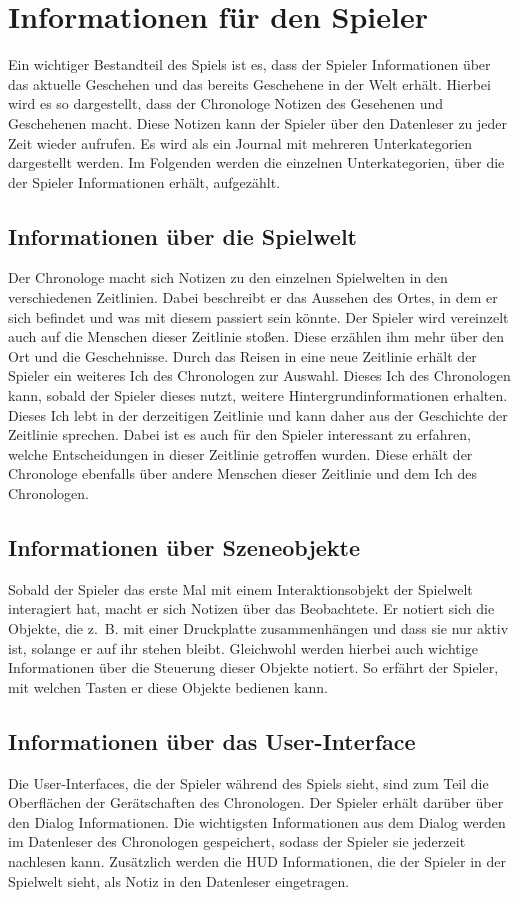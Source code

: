 \section{Informationen für den Spieler}
Ein wichtiger Bestandteil des Spiels ist es, dass der Spieler Informationen über das aktuelle Geschehen und das bereits Geschehene in der Welt erhält. Hierbei wird es so dargestellt, dass der Chronologe Notizen des Gesehenen und Geschehenen macht. Diese Notizen kann der Spieler über den Datenleser zu jeder Zeit wieder aufrufen. Es wird als ein Journal mit mehreren Unterkategorien dargestellt werden. 
Im Folgenden werden die einzelnen Unterkategorien, über die der Spieler Informationen erhält, aufgezählt.

\subsection{Informationen über die Spielwelt}
Der Chronologe macht sich Notizen zu den einzelnen Spielwelten in den verschiedenen Zeitlinien. Dabei beschreibt er das Aussehen des Ortes, in dem er sich befindet und was mit diesem passiert sein könnte. Der Spieler wird vereinzelt auch auf die Menschen dieser Zeitlinie stoßen. Diese erzählen ihm mehr über den Ort und die Geschehnisse. Durch das Reisen in eine neue Zeitlinie erhält der Spieler ein weiteres Ich des Chronologen zur Auswahl. Dieses Ich des Chronologen kann, sobald der Spieler dieses nutzt, weitere Hintergrundinformationen erhalten. Dieses Ich lebt in der derzeitigen Zeitlinie und kann daher aus der Geschichte der Zeitlinie sprechen. 
Dabei ist es auch für den Spieler interessant zu erfahren, welche Entscheidungen in dieser Zeitlinie getroffen wurden. Diese erhält der Chronologe ebenfalls über andere Menschen dieser Zeitlinie und dem Ich des Chronologen.

\subsection{Informationen über Szeneobjekte}
Sobald der Spieler das erste Mal mit einem Interaktionsobjekt der Spielwelt interagiert hat, macht er sich Notizen über das Beobachtete. Er notiert sich die Objekte, die z. B. mit einer Druckplatte zusammenhängen und dass sie nur aktiv ist, solange er auf ihr stehen bleibt. Gleichwohl werden hierbei auch wichtige Informationen über die Steuerung dieser Objekte notiert. So erfährt der Spieler, mit welchen Tasten er diese Objekte bedienen kann.

\subsection{Informationen über das User-Interface}
Die User-Interfaces, die der Spieler während des Spiels sieht, sind zum Teil die Oberflächen der Gerätschaften des Chronologen. Der Spieler erhält darüber über den Dialog Informationen. Die wichtigsten Informationen aus dem Dialog werden im Datenleser des Chronologen gespeichert, sodass der Spieler sie jederzeit nachlesen kann. Zusätzlich werden die \ac{HUD} Informationen, die der Spieler in der Spielwelt sieht, als Notiz in den Datenleser eingetragen. 

